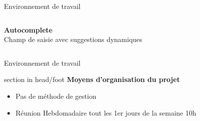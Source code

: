 \documentclass{beamer}
\begin{document}
\begin{frame}{Environnement de travail}
\begin{center}
\begin{minipage}{0.9\textwidth}
\begin{columns}[T, onlytextwidth]
      				\begin{minipage}[t][2cm][t]{\linewidth}
        					\raggedright
        					\textbf{Autocomplete} \\
        					Champ de saisie avec suggestions dynamiques
      				\end{minipage}
      
  			\end{columns}
		\end{minipage}
	\end{center}
	\vfill
\end{frame}

\begin{frame}[label=env]{Environnement de travail}
	\begin{beamercolorbox}[wd=\paperwidth,ht=1.5em,dp=0.5em,leftskip=0.5cm]{section in head/foot}
  		\large \textbf{Moyens d'organisation du projet}
	\end{beamercolorbox}
	\vspace{0.5em}
	\begin{center}
		\begin{minipage}{0.9\textwidth}
	  		\begin{itemize}
  				\item Pas de méthode de gestion
  				\item Réunion Hebdomadaire tout les 1er jours de la semaine 10h
  			\end{itemize}
		\end{minipage}
	\end{center}
	\vfill
\end{frame}
\end{document}
